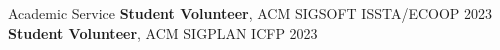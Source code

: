 
\begin{rSection}{Academic Service}
  \textbf{Student Volunteer}, ACM SIGSOFT ISSTA/ECOOP 2023 \hfill \color{darkgray}{Seattle, WA}
	\color{black}
  \\
  \textbf{Student Volunteer}, ACM SIGPLAN ICFP 2023 \hfill \color{darkgray}{Seattle, WA}
	\color{black}

\end{rSection}